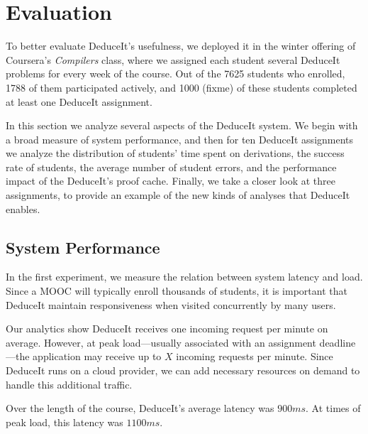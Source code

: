 \documentclass{sigchi}
\begin{document}
\section{Evaluation}

To better evaluate DeduceIt's usefulness, we deployed it in the winter offering of Coursera's \textit{Compilers} class, where we assigned each student several DeduceIt problems for every week of the course. Out of the 7625 students who enrolled, 1788 of them participated actively, and 1000 (fixme) of these students completed at least one DeduceIt assignment.

In this section we analyze several aspects of the DeduceIt system. We begin with a broad measure of system performance, and then for ten DeduceIt assignments we analyze the distribution of students' time spent on derivations, the success rate of students, the average number of student errors, and the performance impact of the DeduceIt's proof cache. Finally, we take a closer look at three assignments, to provide an example of the new kinds of analyses that DeduceIt enables.

\subsection{System Performance}

In the first experiment, we measure the relation between system latency and load. Since a MOOC will typically enroll thousands of students, it is important that DeduceIt maintain responsiveness when visited concurrently by many users. 

Our analytics show DeduceIt receives one incoming request per minute on average. However, at peak load---usually associated with an assignment deadline---the application may receive up to $X$ incoming requests per minute. Since DeduceIt runs on a cloud provider, we can add necessary resources on demand to handle this additional traffic. 

Over the length of the course, DeduceIt's average latency was $900ms$. At times of peak load, this latency was $1100ms$. 
\end{document}
